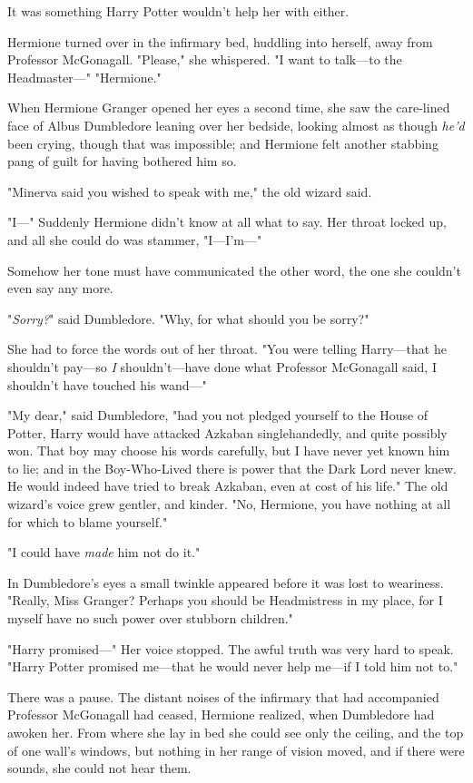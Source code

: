 It was something Harry Potter wouldn't help her with either.

Hermione turned over in the infirmary bed, huddling into herself, away from
Professor McGonagall. "Please," she whispered. "I want to talk---to the
Headmaster---"
\later
"Hermione."

When Hermione Granger opened her eyes a second time, she saw the care-lined
face of Albus Dumbledore leaning over her bedside, looking almost as though
\emph{he'd} been crying, though that was impossible; and Hermione felt another
stabbing pang of guilt for having bothered him so.

"Minerva said you wished to speak with me," the old wizard said.

"I---" Suddenly Hermione didn't know at all what to say. Her throat locked up,
and all she could do was stammer, "I---I'm---"

Somehow her tone must have communicated the other word, the one she couldn't
even say any more.

"\emph{Sorry?}" said Dumbledore. "Why, for what should you be sorry?"

She had to force the words out of her throat. "You were telling Harry---that he
shouldn't pay---so \emph{I} shouldn't---have done what Professor McGonagall
said, I shouldn't have touched his wand---"

"My dear," said Dumbledore, "had you not pledged yourself to the House of
Potter, Harry would have attacked Azkaban singlehandedly, and quite possibly
won. That boy may choose his words carefully, but I have never yet known him to
lie; and in the Boy-Who-Lived there is power that the Dark Lord never knew. He
would indeed have tried to break Azkaban, even at cost of his life." The old
wizard's voice grew gentler, and kinder. "No, Hermione, you have nothing at all
for which to blame yourself."

"I could have \emph{made} him not do it."

In Dumbledore's eyes a small twinkle appeared before it was lost to weariness.
"Really, Miss Granger? Perhaps you should be Headmistress in my place, for I
myself have no such power over stubborn children."

"Harry promised---" Her voice stopped. The awful truth was very hard to speak.
"Harry Potter promised me---that he would never help me---if I told him not to."

There was a pause. The distant noises of the infirmary that had accompanied
Professor McGonagall had ceased, Hermione realized, when Dumbledore had awoken
her. From where she lay in bed she could see only the ceiling, and the top of
one wall's windows, but nothing in her range of vision moved, and if there were
sounds, she could not hear them.

